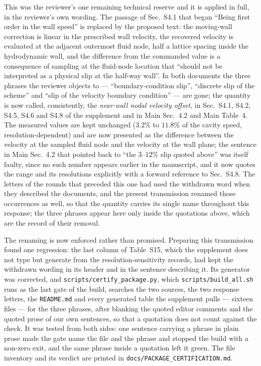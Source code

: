 \documentclass[11pt,a4paper]{article}
\begin{document}
This was the reviewer's one remaining technical reserve and it is applied in full, in
the reviewer's own wording. The passage of Sec.~S4.1 that began ``Being first order in
the wall speed'' is replaced by the proposed text: the moving-wall correction is linear
in the prescribed wall velocity, the recovered velocity is evaluated at the adjacent
outermost fluid node, half a lattice spacing inside the hydrodynamic wall, and the
difference from the commanded value is a consequence of sampling at the fluid-node
location that ``should not be interpreted as a physical slip at the half-way wall''. In
both documents the three phrases the reviewer objects to --- ``boundary-condition slip'',
``discrete slip of the scheme'' and ``slip of the velocity boundary condition'' --- are
gone; the quantity is now called, consistently, the \emph{near-wall nodal velocity
offset}, in Sec.~S4.1, S4.2, S4.5, S4.6 and S4.8 of the supplement and in Main Sec.~4.2
and Main Table~4. The measured values are kept unchanged ($3.2\%$ to $11.8\%$ of the
cavity speed, resolution-dependent) and are now presented as the difference between the
velocity at the sampled fluid node and the velocity at the wall plane; the sentence in
Main Sec.~4.2 that pointed back to ``the $3$--$12\%$ slip quoted above'' was
itself faulty, since no such number appears earlier in the manuscript, and it now quotes
the range and its resolutions explicitly with a forward reference to Sec.~S4.8.
The letters of the rounds that preceded this one had used the withdrawn word when they
described the documents, and the present transmission renamed those occurrences as well,
so that the quantity carries its single name throughout this response; the three phrases
appear here only inside the quotations above, which are the record of their removal.

The renaming is now enforced rather than promised. Preparing this transmission found one
regression: the last column of Table~S15, which the supplement does not type but generate
from the resolution-sensitivity records, had kept the withdrawn wording in its header and
in the sentence describing it. Its generator was corrected, and
\texttt{scripts/}\hspace{0pt}\texttt{certify\_package.py}, which
\texttt{scripts/}\hspace{0pt}\texttt{build\_all.sh} runs as the last gate of the build,
searches the two sources, the two response letters, the \texttt{README.md} and every
generated table the supplement pulls --- sixteen files --- for the three phrases, after
blanking the quoted editor comments and the quoted prose of our own sentences, so that a
quotation does not count against the check. It was tested from both sides: one sentence
carrying a phrase in plain prose made the gate name the file and the phrase and stopped
the build with a non-zero exit, and the same phrase inside a quotation left it green. The
file inventory and its verdict are printed in
\texttt{docs/}\hspace{0pt}\texttt{PACKAGE\_CERTIFICATION.md}.
\end{document}
